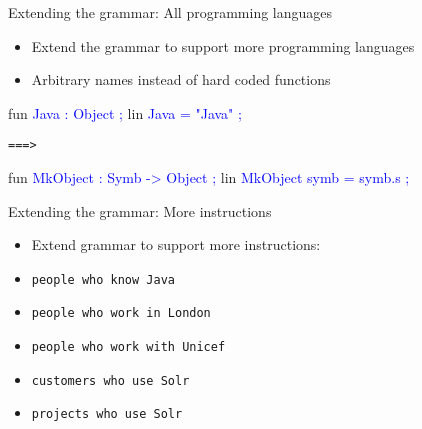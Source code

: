 \begin{frame}[fragile]{Extending the grammar: All programming languages}
\begin{itemize}
\item Extend the grammar to support more programming languages\pause
\item Arbitrary names instead of hard coded functions
\end{itemize}
\begin{semiverbatim}
fun
  \textcolor{Blue}{Java : Object ; }
lin
  \textcolor{Blue}{Java = \textcolor{String}{\textcolor{String}{"Java"}} ; }
\end{semiverbatim}\pause

\texttt{===>}

\begin{semiverbatim}
fun
  \textcolor{Blue}{MkObject : Symb -> Object ; }
lin
  \textcolor{Blue}{MkObject symb = symb.s ; }
\end{semiverbatim}
\end{frame}
\begin{frame}[fragile]{Extending the grammar: More instructions}
\begin{itemize}
\item Extend grammar to support more instructions:\pause
\end{itemize}
  \vspace{-4mm}\begin{itemize}
    \item[] \texttt{people who know Java}
    \item[] \texttt{people who work in London}
    \item[] \texttt{people who work with Unicef}
    \item[] \texttt{customers who use Solr}
    \item[] \texttt{projects who use Solr}
  \end{itemize}\pause
\end{frame}

